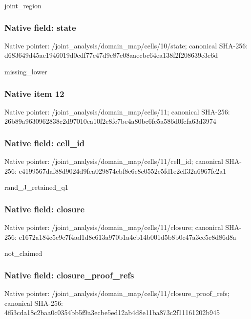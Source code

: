 \documentclass[10pt,a4paper]{article}
\begin{document}
\begingroup\raggedright\sloppy joint\_\allowbreak{}region\par\endgroup

\subsubsection{Native field: state}
Native pointer: /joint\_\allowbreak{}analysis/domain\_\allowbreak{}map/cells/10/state; canonical SHA-256: d683649d45ac1946019d0cdf77c47d9c87e08aaecbc64ea138f2f208639c3e6d

\begingroup\raggedright\sloppy missing\_\allowbreak{}lower\par\endgroup

\subsubsection{Native item 12}
Native pointer: /joint\_\allowbreak{}analysis/domain\_\allowbreak{}map/cells/11; canonical SHA-256: 26b89a9630962838c2d97010ca10f2c8fe7be4a80bc6fc5a586d0fcfa63d3974

\subsubsection{Native field: cell\_\allowbreak{}id}
Native pointer: /joint\_\allowbreak{}analysis/domain\_\allowbreak{}map/cells/11/cell\_\allowbreak{}id; canonical SHA-256: e4199567daf88d9024d9fea029874cbf8e6c8c0552e5fd1e2cff32a6967fe2a1

\begingroup\raggedright\sloppy rand\_\allowbreak{}J\_\allowbreak{}retained\_\allowbreak{}q1\par\endgroup

\subsubsection{Native field: closure}
Native pointer: /joint\_\allowbreak{}analysis/domain\_\allowbreak{}map/cells/11/closure; canonical SHA-256: c1672a184c5e9c7f4ad1d8e613a970b1a4eb14b001d5b8b0c47a3ee5c8d86d8a

\begingroup\raggedright\sloppy not\_\allowbreak{}claimed\par\endgroup

\subsubsection{Native field: closure\_\allowbreak{}proof\_\allowbreak{}refs}
Native pointer: /joint\_\allowbreak{}analysis/domain\_\allowbreak{}map/cells/11/closure\_\allowbreak{}proof\_\allowbreak{}refs; canonical SHA-256: 4f53cda18c2baa0c0354bb5f9a3ecbe5ed12ab4d8e11ba873c2f11161202b945
\end{document}
